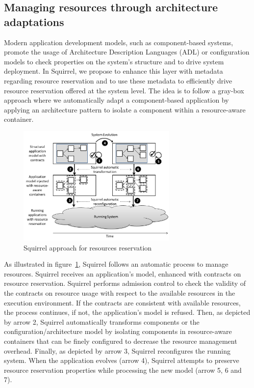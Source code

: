 \subsection{Managing resources through architecture adaptations}
Modern application development models, such as component-based systems, promote the usage of Architecture Description Languages (ADL) or configuration models to check properties on the system's structure and to drive system deployment. 
In Squirrel, we propose to enhance this layer with metadata regarding resource reservation and to use these metadata to efficiently drive resource reservation offered at the system level.  
The idea is to follow a gray-box approach where we automatically adapt a component-based application by applying an architecture pattern to isolate a component within a resource-aware container.

\begin{figure}[htbp]
\centering
\includegraphics[width=0.7\textwidth]{chapter4/figures/globalOverview.png}
\caption{Squirrel approach for resources reservation} \label{fig:Overview}
\vspace{-0.5cm}
\end{figure}	

As illustrated in figure~\ref{fig:Overview}, Squirrel follows an automatic process to manage resources.
Squirrel receives an application's model, enhanced with contracts on resource reservation. 
Squirrel performs admission control to check the validity of the contracts on resource usage with respect to the available resources in the execution environment.
If the contracts are consistent with available resources, the process continues, if not, the application's model is refused.
Then, as depicted by arrow 2, Squirrel automatically transforms components or the configuration/architecture model by isolating components in resource-aware containers that can be finely configured to decrease the resource management overhead.
Finally, as depicted by arrow 3, Squirrel reconfigures the running system.
When the application evolves (arrow 4), 
Squirrel attempts to preserve resource reservation properties while processing the new model (arrow 5, 6 and 7).


